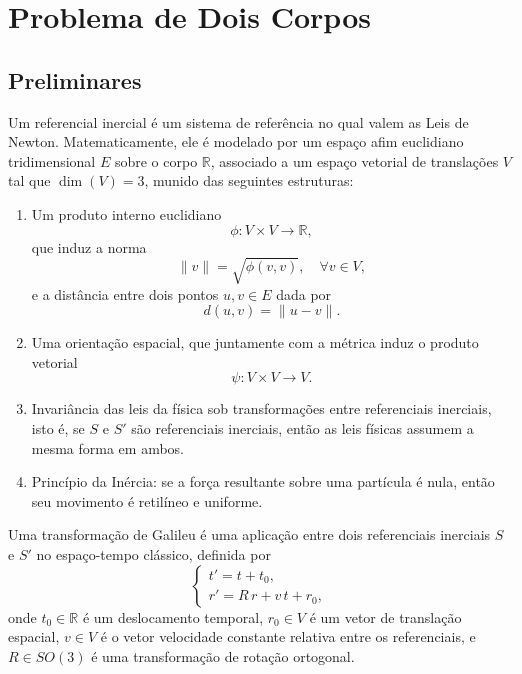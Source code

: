 \documentclass[../main]{subfiles}
\begin{document}
\section{Problema de Dois Corpos}\label{section:problema-de-dois-corpos}

\subsection{Preliminares}\label{subsection:fundamentacao-matematica}
\begin{defi}
  Um referencial inercial é um sistema de referência no qual valem as Leis de Newton. Matematicamente, ele é modelado por um espaço afim euclidiano tridimensional $E$ sobre o corpo $\mathbb{R}$, associado a um espaço vetorial de translações $V$ tal que $\dim(V)=3$, munido das seguintes estruturas:

  \begin{enumerate}
    \item Um produto interno euclidiano
      \[
        \phi: V \times V \longrightarrow \mathbb{R},
      \]
      que induz a norma
      \[
        \|v\| = \sqrt{\phi(v,v)}, \quad \forall v \in V,
      \]
      e a distância entre dois pontos $u,v \in E$ dada por
      \[
        d(u,v) = \| u - v \|.
      \]

    \item Uma orientação espacial, que juntamente com a métrica induz o produto vetorial
      \[
        \psi : V \times V \longrightarrow V.
      \]

    \item Invariância das leis da física sob transformações entre referenciais inerciais, isto é, se $S$ e $S'$ são referenciais inerciais, então as leis físicas assumem a mesma forma em ambos.

    \item Princípio da Inércia: se a força resultante sobre uma partícula é nula, então seu movimento é retilíneo e uniforme.
  \end{enumerate}
\end{defi}

\begin{defi}
  Uma transformação de Galileu é uma aplicação entre dois referenciais inerciais $S$ e $S'$ no espaço-tempo clássico, definida por
  \[
    \begin{cases}
      t' = t + t_0, \\
      r' = R\,r + v\, t + r_0,
    \end{cases}
  \]
  onde $t_0 \in \mathbb{R}$ é um deslocamento temporal, $r_0 \in V$ é um vetor de translação espacial, $v \in V$ é o vetor velocidade constante relativa entre os referenciais, e $R \in SO(3)$ é uma transformação de rotação ortogonal.
\end{defi}
\end{document}

